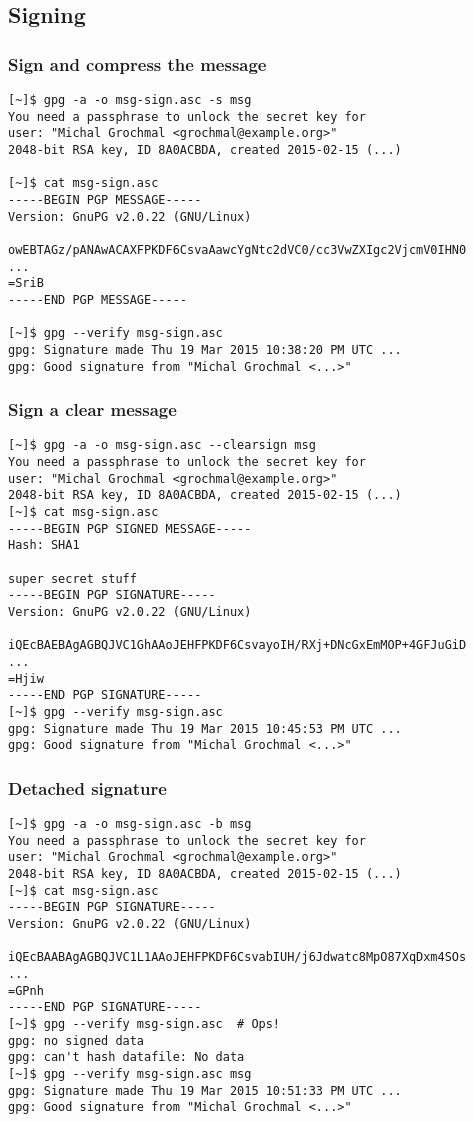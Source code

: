 \documentclass[hyperref={colorlinks=true}]{beamer}
\begin{document}
\subsection{Signing}
\begin{frame}[fragile]\frametitle{Sign and compress the message}
{\footnotesize
\begin{verbatim}
[~]$ gpg -a -o msg-sign.asc -s msg
You need a passphrase to unlock the secret key for
user: "Michal Grochmal <grochmal@example.org>"
2048-bit RSA key, ID 8A0ACBDA, created 2015-02-15 (...)

[~]$ cat msg-sign.asc
-----BEGIN PGP MESSAGE-----
Version: GnuPG v2.0.22 (GNU/Linux)

owEBTAGz/pANAwACAXFPKDF6CsvaAawcYgNtc2dVC0/cc3VwZXIgc2VjcmV0IHN0
...
=SriB
-----END PGP MESSAGE-----

[~]$ gpg --verify msg-sign.asc
gpg: Signature made Thu 19 Mar 2015 10:38:20 PM UTC ...
gpg: Good signature from "Michal Grochmal <...>"
\end{verbatim}
}
\end{frame}

\begin{frame}[fragile]\frametitle{Sign a clear message}
{\scriptsize
\begin{verbatim}
[~]$ gpg -a -o msg-sign.asc --clearsign msg
You need a passphrase to unlock the secret key for
user: "Michal Grochmal <grochmal@example.org>"
2048-bit RSA key, ID 8A0ACBDA, created 2015-02-15 (...)
[~]$ cat msg-sign.asc
-----BEGIN PGP SIGNED MESSAGE-----
Hash: SHA1

super secret stuff
-----BEGIN PGP SIGNATURE-----
Version: GnuPG v2.0.22 (GNU/Linux)

iQEcBAEBAgAGBQJVC1GhAAoJEHFPKDF6CsvayoIH/RXj+DNcGxEmMOP+4GFJuGiD
...
=Hjiw
-----END PGP SIGNATURE-----
[~]$ gpg --verify msg-sign.asc
gpg: Signature made Thu 19 Mar 2015 10:45:53 PM UTC ...
gpg: Good signature from "Michal Grochmal <...>"
\end{verbatim}
}
\end{frame}

\begin{frame}[fragile]\frametitle{Detached signature}
{\footnotesize
\begin{verbatim}
[~]$ gpg -a -o msg-sign.asc -b msg
You need a passphrase to unlock the secret key for
user: "Michal Grochmal <grochmal@example.org>"
2048-bit RSA key, ID 8A0ACBDA, created 2015-02-15 (...)
[~]$ cat msg-sign.asc
-----BEGIN PGP SIGNATURE-----
Version: GnuPG v2.0.22 (GNU/Linux)

iQEcBAABAgAGBQJVC1L1AAoJEHFPKDF6CsvabIUH/j6Jdwatc8MpO87XqDxm4SOs
...
=GPnh
-----END PGP SIGNATURE-----
[~]$ gpg --verify msg-sign.asc  # Ops!
gpg: no signed data
gpg: can't hash datafile: No data
[~]$ gpg --verify msg-sign.asc msg
gpg: Signature made Thu 19 Mar 2015 10:51:33 PM UTC ...
gpg: Good signature from "Michal Grochmal <...>"
\end{verbatim}
}
\end{frame}
\end{document}
